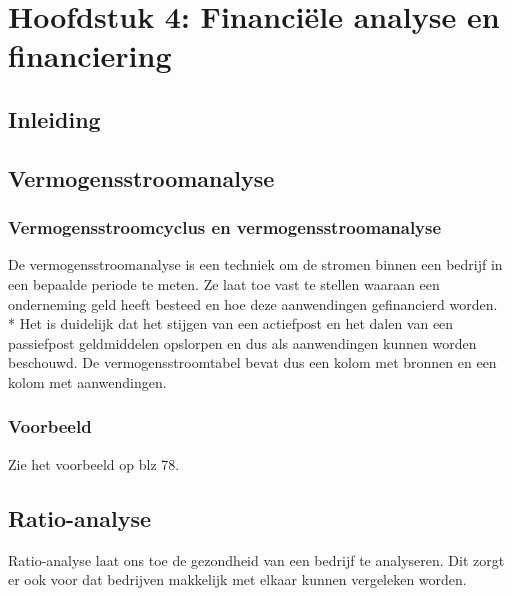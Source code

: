 \documentclass[12pt]{article}
\begin{document}
\section{Hoofdstuk 4: Financi\"ele analyse en financiering}
\subsection{Inleiding}
\subsection{Vermogensstroomanalyse}
\subsubsection{Vermogensstroomcyclus en vermogensstroomanalyse}
De vermogensstroomanalyse is een techniek om de stromen binnen een bedrijf in een bepaalde periode te meten. Ze laat toe vast te stellen waaraan een onderneming geld heeft besteed en hoe deze aanwendingen gefinancierd worden.\\*
Het is duidelijk dat het stijgen van een actiefpost en het dalen van een passiefpost geldmiddelen opslorpen en dus als aanwendingen kunnen worden beschouwd. De vermogensstroomtabel bevat dus een kolom met bronnen en een kolom met aanwendingen.
\subsubsection{Voorbeeld}
Zie het voorbeeld op blz 78.
\subsection{Ratio-analyse}
Ratio-analyse laat ons toe de gezondheid van een bedrijf te analyseren. Dit zorgt er ook voor dat bedrijven makkelijk met elkaar kunnen vergeleken worden.
\end{document}
